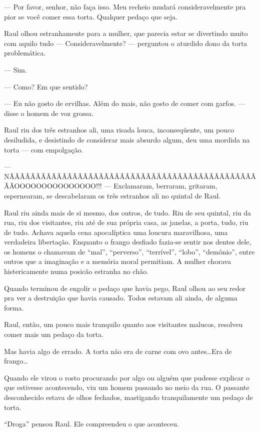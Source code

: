 --- Por favor, senhor, não faça isso. Meu recheio mudará consideravelmente pra pior se você comer essa torta. Qualquer pedaço que seja.

Raul olhou estranhamente para a mulher, que parecia estar se divertindo muito com aquilo tudo --- Consideravelmente? --- perguntou o aturdido dono da torta problemática.

--- Sim.

--- Como? Em que sentido?

--- Eu não gosto de ervilhas. Além do mais, não gosto de comer com garfos. --- disse o homem de voz grossa.

Raul riu dos três estranhos ali, uma risada louca, inconseqüente, um pouco desiludida, e desistindo de considerar mais absurdo algum, deu uma mordida na torta --- com empolgação.

--- N\-Ã\-Ã\-Ã\-Ã\-Ã\-Ã\-Ã\-Ã\-Ã\-Ã\-Ã\-Ã\-Ã\-Ã\-Ã\-Ã\-Ã\-Ã\-Ã\-Ã\-Ã\-Ã\-Ã\-Ã\-Ã\-Ã\-Ã\-Ã\-Ã\-Ã\-Ã\-Ã\-Ã\-Ã\-ÃÃ\-Ã\-Ã\-Ã\-Ã\-Ã\-Ã\-Ã\-Ã\-Ã\-Ã\-Ã\-Ã\-Ã\-O\-O\-O\-O\-O\-O\-O\-O\-O\-O\-O\-O\-O\-O\-O!!! --- Exclamaram, berraram, gritaram, espernearam, se descabelaram os três estranhos ali no quintal de Raul.

Raul riu ainda mais de si mesmo, dos outros, de tudo. Riu de seu quintal, riu da rua, riu dos visitantes, riu até de sua própria casa, as janelas, a porta, tudo, riu de tudo. Achava aquela cena apocalíptica uma loucura maravilhosa, uma verdadeira libertação. Enquanto o frango desfiado fazia-se sentir nos dentes dele, os homens o chamavam de “mal”, “perverso”, “terrível”, “lobo”, “demônio”, entre outros que a imaginação e a memória moral permitiam. A mulher chorava histericamente numa posicão estranha no chão.

Quando terminou de engolir o pedaço que havia pego, Raul olhou ao seu redor pra ver a destruição que havia causado. Todos estavam ali ainda, de alguma forma.

Raul, então, um pouco mais tranquilo quanto aos visitantes malucos, resolveu comer mais um pedaço da torta.

Mas havia algo de errado. A torta não era de carne com ovo antes\ldots Era de frango\ldots

Quando ele virou o rosto procurando por algo ou alguém que pudesse explicar o que estivesse acontecendo, viu um homem passando no meio da rua. O passante desconhecido estava de olhos fechados, mastigando tranquilamente um pedaço de torta.

``Droga'' pensou Raul. Ele compreendeu o que aconteceu.

